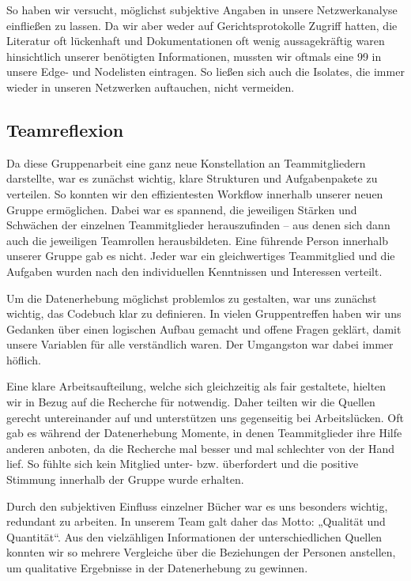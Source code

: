 \documentclass[
]{article}
\begin{document}
So haben wir versucht, möglichst subjektive Angaben in unsere
Netzwerkanalyse einfließen zu lassen. Da wir aber weder auf
Gerichtsprotokolle Zugriff hatten, die Literatur oft lückenhaft und
Dokumentationen oft wenig aussagekräftig waren hinsichtlich unserer
benötigten Informationen, mussten wir oftmals eine 99 in unsere Edge-
und Nodelisten eintragen. So ließen sich auch die Isolates, die immer
wieder in unseren Netzwerken auftauchen, nicht vermeiden.

\hypertarget{teamreflexion}{%
\subsection{Teamreflexion}\label{teamreflexion}}

Da diese Gruppenarbeit eine ganz neue Konstellation an Teammitgliedern
darstellte, war es zunächst wichtig, klare Strukturen und Aufgabenpakete
zu verteilen. So konnten wir den effizientesten Workflow innerhalb
unserer neuen Gruppe ermöglichen. Dabei war es spannend, die jeweiligen
Stärken und Schwächen der einzelnen Teammitglieder herauszufinden -- aus
denen sich dann auch die jeweiligen Teamrollen herausbildeten. Eine
führende Person innerhalb unserer Gruppe gab es nicht. Jeder war ein
gleichwertiges Teammitglied und die Aufgaben wurden nach den
individuellen Kenntnissen und Interessen verteilt.

Um die Datenerhebung möglichst problemlos zu gestalten, war uns zunächst
wichtig, das Codebuch klar zu definieren. In vielen Gruppentreffen haben
wir uns Gedanken über einen logischen Aufbau gemacht und offene Fragen
geklärt, damit unsere Variablen für alle verständlich waren. Der
Umgangston war dabei immer höflich.

Eine klare Arbeitsaufteilung, welche sich gleichzeitig als fair
gestaltete, hielten wir in Bezug auf die Recherche für notwendig. Daher
teilten wir die Quellen gerecht untereinander auf und unterstützen uns
gegenseitig bei Arbeitslücken. Oft gab es während der Datenerhebung
Momente, in denen Teammitglieder ihre Hilfe anderen anboten, da die
Recherche mal besser und mal schlechter von der Hand lief. So fühlte
sich kein Mitglied unter- bzw. überfordert und die positive Stimmung
innerhalb der Gruppe wurde erhalten.

Durch den subjektiven Einfluss einzelner Bücher war es uns besonders
wichtig, redundant zu arbeiten. In unserem Team galt daher das Motto:
„Qualität und Quantität``. Aus den vielzähligen Informationen der
unterschiedlichen Quellen konnten wir so mehrere Vergleiche über die
Beziehungen der Personen anstellen, um qualitative Ergebnisse in der
Datenerhebung zu gewinnen.
\end{document}
